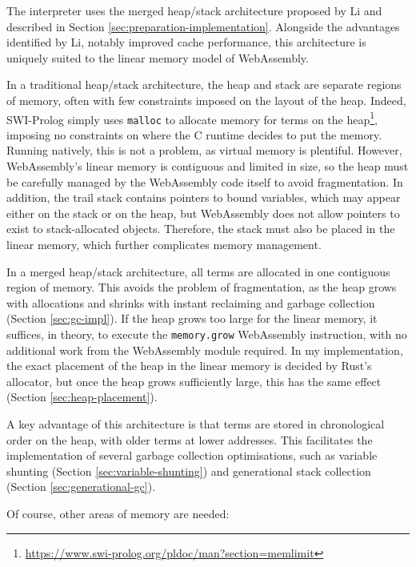 \label{sec:memory-layout}

The interpreter uses the merged heap/stack architecture proposed by Li \cite{liEfficientMemoryManagement2000} and described in Section \ref{sec:preparation-implementation}. Alongside the advantages identified by Li, notably improved cache performance, this architecture is uniquely suited to the linear memory model of WebAssembly.

In a traditional heap/stack architecture, the heap and stack are separate regions of memory, often with few constraints imposed on the layout of the heap. Indeed, SWI-Prolog simply uses \texttt{malloc} to allocate memory for terms on the heap\footnote{\url{https://www.swi-prolog.org/pldoc/man?section=memlimit}}, imposing no constraints on where the C runtime decides to put the memory. Running natively, this is not a problem, as virtual memory is plentiful. However, WebAssembly's linear memory is contiguous and limited in size, so the heap must be carefully managed by the WebAssembly code itself to avoid fragmentation. In addition, the trail stack contains pointers to bound variables, which may appear either on the stack or on the heap, but WebAssembly does not allow pointers to exist to stack-allocated objects. Therefore, the stack must also be placed in the linear memory, which further complicates memory management.

In a merged heap/stack architecture, all terms are allocated in one contiguous region of memory. This avoids the problem of fragmentation, as the heap grows with allocations and shrinks with instant reclaiming and garbage collection (Section \ref{sec:gc-impl}). If the heap grows too large for the linear memory, it suffices, in theory, to execute the \texttt{memory.grow} WebAssembly instruction, with no additional work from the WebAssembly module required. In my implementation, the exact placement of the heap in the linear memory is decided by Rust's allocator, but once the heap grows sufficiently large, this has the same effect (Section \ref{sec:heap-placement}).

A key advantage of this architecture is that terms are stored in chronological order on the heap, with older terms at lower addresses. This facilitates the implementation of several garbage collection optimisations, such as variable shunting (Section \ref{sec:variable-shunting}) and generational stack collection (Section \ref{sec:generational-gc}).

Of course, other areas of memory are needed:


